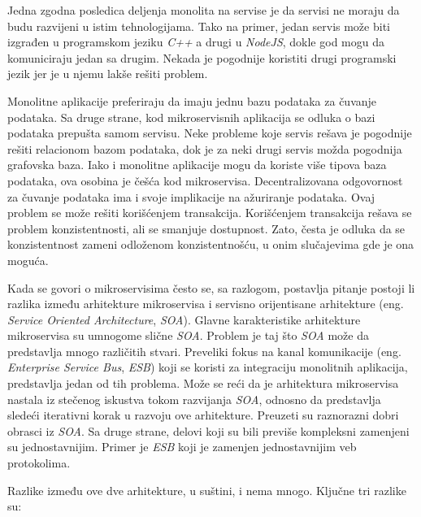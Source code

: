 Jedna zgodna posledica deljenja monolita na servise je da servisi ne moraju da budu razvijeni u istim 
tehnologijama. Tako na primer, jedan servis može biti izgrađen u programskom jeziku \textit{C++} a drugi u 
\textit{NodeJS}, dokle god mogu da komuniciraju jedan sa drugim. Nekada je pogodnije koristiti drugi programski 
jezik jer je u njemu lakše rešiti problem.

Monolitne aplikacije preferiraju da imaju jednu bazu podataka za čuvanje podataka. Sa druge strane, kod 
mikroservisnih aplikacija se odluka o bazi podataka prepušta samom servisu. Neke probleme koje servis 
rešava je pogodnije rešiti relacionom bazom podataka, dok je za neki drugi servis možda pogodnija grafovska baza.
Iako i monolitne aplikacije mogu da koriste više tipova baza podataka, ova osobina je češća kod 
mikroservisa. Decentralizovana odgovornost za čuvanje podataka ima i svoje implikacije na ažuriranje 
podataka. Ovaj problem se može rešiti korišćenjem transakcija. Korišćenjem transakcija rešava se problem 
konzistentnosti, ali se smanjuje dostupnost. Zato, česta je odluka da se konzistentnost zameni 
odloženom konzistentnošću, u onim slučajevima gde je ona moguća. 

Kada se govori o mikroservisima često se, sa razlogom, postavlja pitanje postoji li razlika između arhitekture
mikroservisa i servisno orijentisane arhitekture (eng. \textit{Service Oriented Architecture}, \textit{SOA}). 
Glavne karakteristike arhitekture mikroservisa su umnogome slične \textit{SOA}. Problem je taj što \textit{SOA} 
može da predstavlja mnogo različitih stvari. Preveliki fokus na kanal komunikacije 
(eng. \textit{Enterprise Service Bus}, \textit{ESB}) koji se koristi za integraciju monolitnih aplikacija, 
predstavlja jedan od tih problema. Može se reći da je arhitektura mikroservisa nastala iz stečenog iskustva tokom 
razvijanja \textit{SOA}, odnosno da predstavlja sledeći iterativni korak u razvoju ove arhitekture. 
Preuzeti su raznorazni dobri obrasci iz \textit{SOA}. Sa druge strane, delovi koji su bili previše kompleksni 
zamenjeni su jednostavnijim. Primer je \textit{ESB} koji je zamenjen jednostavnijim veb protokolima. 

Razlike između ove dve arhitekture, u suštini, i nema mnogo. Ključne tri razlike su:

